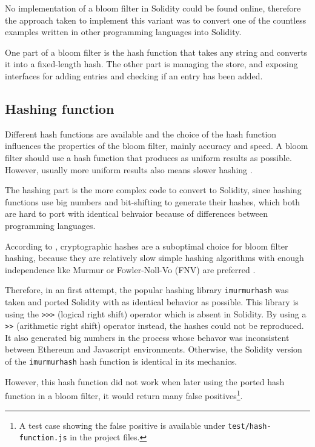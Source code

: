No implementation of a bloom filter in Solidity could be found online, therefore the approach taken to implement this variant was to convert one of the countless examples written in other programming languages into Solidity.

One part of a bloom filter is the hash function that takes any string and converts it into a fixed-length hash. The other part is managing the store, and exposing interfaces for adding entries and checking if an entry has been added.

\subsection{Hashing function}

Different hash functions are available and the choice of the hash function influences the properties of the bloom filter, mainly accuracy and speed. A bloom filter should use a hash function that produces as uniform results as possible. However, usually more uniform results also means slower hashing \cite{BloomfilterTutorial}.

The hashing part is the more complex code to convert to Solidity, since hashing functions use big numbers and bit-shifting to generate their hashes, which both are hard to port with identical behvaior because of differences between programming languages.

According to \cite{BloomfilterTutorial}, cryptographic hashes are a suboptimal choice for bloom filter hashing, because they are relatively slow \textemdash{} simple hashing algorithms with enough independence like Murmur or Fowler-Noll-Vo (FNV) are preferred \cite{BloomfilterHashingPerformance}.

Therefore, in an first attempt, the popular hashing library \texttt{imurmurhash} \cite{imurmur} was taken and ported Solidity with as identical behavior as possible. This library is using the \texttt{\textgreater{}\textgreater{}\textgreater} (logical right shift) operator which is absent in Solidity. By using a \texttt{\textgreater{}\textgreater} (arithmetic right shift) operator instead, the hashes could not be reproduced. It also generated big numbers in the process whose behavor was inconsistent between Ethereum and Javascript environments. Otherwise, the Solidity version of the \texttt{imurmurhash} hash function is identical in its mechanics.

However, this hash function did not work \textemdash{} when later using the ported hash function in a bloom filter, it would return many false positives\footnote{A test case showing the false positive is available under \texttt{test/hash-function.js} in the project files.}.

